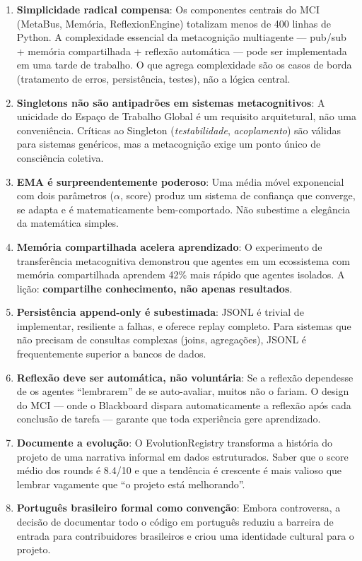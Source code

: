 \begin{enumerate}
    \item \textbf{Simplicidade radical compensa}: Os componentes centrais do MCI (MetaBus, Memória, ReflexionEngine) totalizam menos de 400 linhas de Python. A complexidade essencial da metacognição multiagente — pub/sub + memória compartilhada + reflexão automática — pode ser implementada em uma tarde de trabalho. O que agrega complexidade são os casos de borda (tratamento de erros, persistência, testes), não a lógica central.
    
    \item \textbf{Singletons não são antipadrões em sistemas metacognitivos}: A unicidade do Espaço de Trabalho Global é um requisito arquitetural, não uma conveniência. Críticas ao Singleton (\textit{testabilidade}, \textit{acoplamento}) são válidas para sistemas genéricos, mas a metacognição exige um ponto único de consciência coletiva.
    
    \item \textbf{EMA é surpreendentemente poderoso}: Uma média móvel exponencial com dois parâmetros ($\alpha$, score) produz um sistema de confiança que converge, se adapta e é matematicamente bem-comportado. Não subestime a elegância da matemática simples.
    
    \item \textbf{Memória compartilhada acelera aprendizado}: O experimento de transferência metacognitiva demonstrou que agentes em um ecossistema com memória compartilhada aprendem 42\% mais rápido que agentes isolados. A lição: \textbf{compartilhe conhecimento, não apenas resultados}.
    
    \item \textbf{Persistência append-only é subestimada}: JSONL é trivial de implementar, resiliente a falhas, e oferece replay completo. Para sistemas que não precisam de consultas complexas (joins, agregações), JSONL é frequentemente superior a bancos de dados.
    
    \item \textbf{Reflexão deve ser automática, não voluntária}: Se a reflexão dependesse de os agentes ``lembrarem'' de se auto-avaliar, muitos não o fariam. O design do MCI — onde o Blackboard dispara automaticamente a reflexão após cada conclusão de tarefa — garante que toda experiência gere aprendizado.
    
    \item \textbf{Documente a evolução}: O EvolutionRegistry transforma a história do projeto de uma narrativa informal em dados estruturados. Saber que o score médio dos rounds é 8.4/10 e que a tendência é crescente é mais valioso que lembrar vagamente que ``o projeto está melhorando''.
    
    \item \textbf{Português brasileiro formal como convenção}: Embora controversa, a decisão de documentar todo o código em português reduziu a barreira de entrada para contribuidores brasileiros e criou uma identidade cultural para o projeto.
\end{enumerate}

